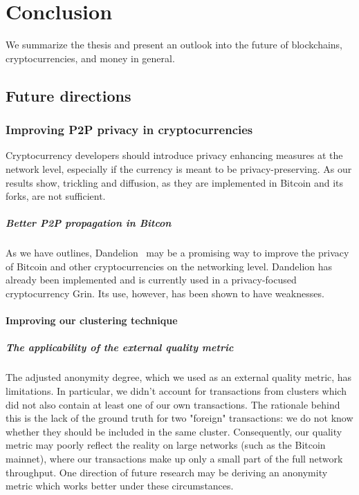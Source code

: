 \chapter{Conclusion}

\label{Chapter13Conclusion}

We summarize the thesis and present an outlook into the future of blockchains, cryptocurrencies, and money in general.

\section{Future directions}

\subsection{Improving P2P privacy in cryptocurrencies}

Cryptocurrency developers should introduce privacy enhancing measures at the network level, especially if the currency is meant to be privacy-preserving.
As our results show, trickling and diffusion, as they are implemented in Bitcoin and its forks, are not sufficient.

\paragraph{Better P2P propagation in Bitcon}
As we have outlines, Dandelion~\cite{Venkatakrishnan2017, Fanti2018} may be a promising way to improve the privacy of Bitcoin and other cryptocurrencies on the networking level.
Dandelion has already been implemented and is currently used in a privacy-focused cryptocurrency Grin.
Its use, however, has been shown to have weaknesses.

\subsubsection*{Improving our clustering technique}

\paragraph{The applicability of the external quality metric}
The adjusted anonymity degree, which we used as an external quality metric, has limitations.
In particular, we didn't account for transactions from clusters which did not also contain at least one of our own transactions.
The rationale behind this is the lack of the ground truth for two "foreign" transactions: we do not know whether they should be included in the same cluster.
Consequently, our quality metric may poorly reflect the reality on large networks (such as the Bitcoin mainnet), where our transactions make up only a small part of the full network throughput.
One direction of future research may be deriving an anonymity metric which works better under these circumstances.

